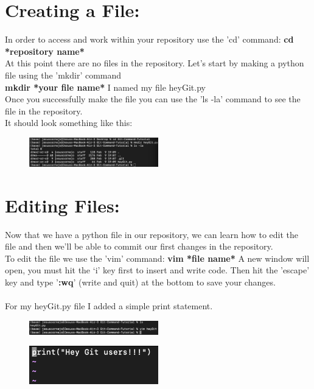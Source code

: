 \documentclass[10pt,twocolumn]{article}
\begin{document}
\section{Creating a File:}
In order to access and work within your repository use the 'cd' command:  \textbf{cd *repository name*}\\
At this point there are no files in the repository. Let's start by making a python file using the 'mkdir' command\\
\textbf{mkdir *your file name*} I named my file heyGit.py\\
Once you successfully make the file you can use the 'ls -la' command to see the file in the repository.\\
It should look something like this:

\begin{figure}[h!]
\center
\includegraphics[width=0.5\textwidth]{screenshots/sc2.png}
\end{figure}

\section{Editing Files:}
Now that we have a python file in our repository, we can learn how to edit the file and then we'll be able to commit our first changes in the repository.\\
To edit the file we use the 'vim' command: \textbf{vim *file name*} A new window will open, you must hit the ‘i’ key first to insert and write code. Then hit the 'escape' key and type '\textbf{:wq}' (write and quit) at the bottom to save your changes.\\ \\
For my heyGit.py file I added a simple print statement.

\begin{figure}[h!]
\center
\includegraphics[width=0.5\textwidth]{screenshots/sc3.png}
\end{figure}

\begin{figure}[h!]
\center
\includegraphics[width=0.5\textwidth]{screenshots/sc4.png}
\end{figure}
\end{document}
